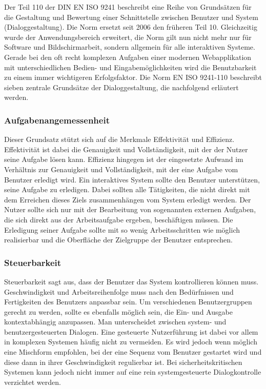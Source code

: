 Der Teil 110 der DIN EN ISO 9241 beschreibt eine Reihe von Grundsätzen für die Gestaltung und Bewertung einer Schnittstelle zwischen Benutzer und System (Dialoggestaltung). Die Norm ersetzt seit 2006 den früheren Teil 10. Gleichzeitig wurde der Anwendungsbereich erweitert, die Norm gilt nun nicht mehr nur für Software und Bildschirmarbeit, sondern allgemein für alle \glqq{}interaktiven Systeme\grqq{}. Gerade bei den oft recht komplexen Aufgaben einer modernen Webapplikation mit unterschiedlichen Bedien- und Eingabemöglichkeiten wird die Benutzbarkeit zu einem immer wichtigeren Erfolgsfaktor. Die Norm EN ISO 9241-110 beschreibt sieben zentrale Grundsätze der Dialoggestaltung, die nachfolgend erläutert werden.

\subsubsection{Aufgabenangemessenheit}

Dieser Grundsatz stützt sich auf die Merkmale Effektivität und Effizienz. Effektivität ist dabei die Genauigkeit und Vollständigkeit, mit der der Nutzer seine Aufgabe lösen kann. Effizienz hingegen ist der eingesetzte Aufwand im Verhältnis zur Genauigkeit und Vollständigkeit, mit der eine Aufgabe vom Benutzer erledigt wird. Ein interaktives System sollte den Benutzer unterstützen, seine Aufgabe zu erledigen. Dabei sollten alle Tätigkeiten, die nicht direkt mit dem Erreichen dieses Ziels zusammenhängen vom System erledigt werden. Der Nutzer sollte sich nur mit der Bearbeitung von sogenannten externen Aufgaben, die sich direkt aus der Arbeitsaufgabe ergeben, beschäftigen müssen. Die Erledigung seiner Aufgabe sollte mit so wenig Arbeitsschritten wie möglich realisierbar und die Oberfläche der Zielgruppe der Benutzer entsprechen. \parencite[vgl.][169\psqq]{Herczeg2009}

\subsubsection{Steuerbarkeit}

Steuerbarkeit sagt aus, dass der Benutzer das System kontrollieren können muss. Geschwindigkeit und Arbeitsreihenfolge muss nach den Bedürfnissen und Fertigkeiten des Benutzers anpassbar sein. Um verschiedenen Benutzergruppen gerecht zu werden, sollte es ebenfalls möglich sein, die Ein- und Ausgabe kontextabhängig anzupassen. Man unterscheidet zwischen system- und benutzergesteuerten Dialogen. Eine gesteuerte Nutzerführung ist dabei vor allem in komplexen Systemen häufig nicht zu vermeiden. Es wird jedoch wenn möglich eine Mischform empfohlen, bei der eine Sequenz vom Benutzer gestartet wird und diese dann in ihrer Geschwindigkeit regulierbar ist.\parencite[vgl.][179\psqq]{Herczeg2009} Bei sicherheitskritischen Systemen kann jedoch nicht immer auf eine rein systemgesteuerte Dialogkontrolle verzichtet werden.

